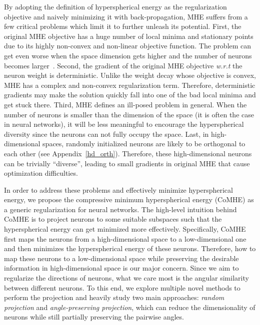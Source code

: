 \par
By adopting the definition of hyperspherical energy as the regularization objective and naively minimizing it with back-propagation, MHE suffers from a few critical problems which limit it to further unleash its potential. First, the original MHE objective has a huge number of local minima and stationary points due to its highly non-convex and non-linear objective function. The problem can get even worse when the space dimension gets higher and the number of neurons becomes larger~\cite{batle2016generalized,calef2015estimating}. Second, the gradient of the original MHE objective \emph{w.r.t} the neuron weight is deterministic. Unlike the weight decay whose objective is convex, MHE has a complex and non-convex regularization term. Therefore, deterministic gradients may make the solution quickly fall into one of the bad local minima and get stuck there. Third, MHE defines an ill-posed problem in general. When the number of neurons is smaller than the dimension of the space (it is often the case in neural networks), it will be less meaningful to encourage the hyperspherical diversity since the neurons can not fully occupy the space. Last, in high-dimensional spaces, randomly initialized neurons are likely to be orthogonal to each other (see Appendix~\ref{hd_orth}). Therefore, these high-dimensional neurons can be trivially ``diverse'', leading to small gradients in original MHE that cause optimization difficulties. 
\par 
In order to address these problems and effectively minimize hyperspherical energy, we propose the compressive minimum hyperspherical energy (CoMHE) as a generic regularization for neural networks. The high-level intuition behind CoMHE is to project neurons to some suitable subspaces such that the hyperspherical energy can get minimized more effectively. Specifically, CoMHE first maps the neurons from a high-dimensional space to a low-dimensional one and then minimizes the hyperspherical energy of these neurons. Therefore, how to map these neurons to a low-dimensional space while preserving the desirable information in high-dimensional space is our major concern. Since we aim to regularize the directions of neurons, what we care most is the angular similarity between different neurons. To this end, we explore multiple novel methods to perform the projection and heavily study two main approaches: \emph{random projection} and \emph{angle-preserving projection}, which can reduce the dimensionality of neurons while still partially preserving the pairwise angles. 
